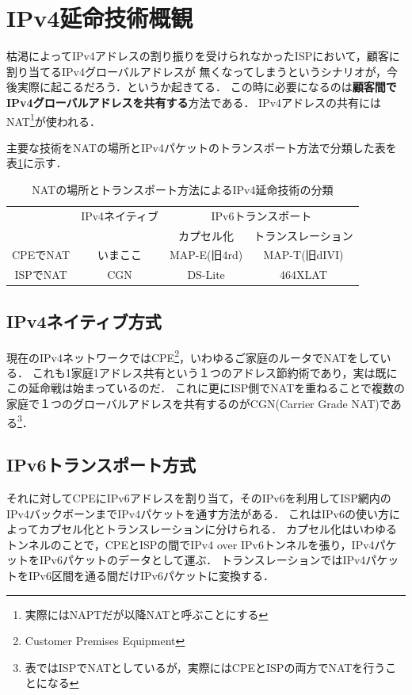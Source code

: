 \section{IPv4延命技術概観}

\lettrine{枯}
渇によってIPv4アドレスの割り振りを受けられなかったISPにおいて，顧客に割り当てるIPv4グローバルアドレスが
無くなってしまうというシナリオが，今後実際に起こるだろう．というか起きてる．
この時に必要になるのは\textbf{顧客間でIPv4グローバルアドレスを共有する}方法である．
IPv4アドレスの共有にはNAT\footnote{実際にはNAPTだが以降NATと呼ぶことにする}が使われる．

主要な技術をNATの場所とIPv4パケットのトランスポート方法で分類した表を表\ref{yuyarin-nat-transport}に示す．

\begin{table}[htbp]
\begin{center}
\begin{tabular}{cccc} \hline
 & IPv4ネイティブ & \multicolumn{2}{c}{IPv6トランスポート} \\
 & & カプセル化 & トランスレーション \\\hline
CPEでNAT & いまここ & MAP-E(旧4rd) & MAP-T(旧dIVI) \\
ISPでNAT & CGN & DS-Lite & 464XLAT \\\hline
\end{tabular}
\end{center}
\caption{NATの場所とトランスポート方法によるIPv4延命技術の分類}
\label{yuyarin-nat-transport}
\end{table}

\subsection{IPv4ネイティブ方式}

現在のIPv4ネットワークではCPE\footnote{Customer Premises Equipment}，いわゆるご家庭のルータでNATをしている．
これも1家庭1アドレス共有という１つのアドレス節約術であり，実は既にこの延命戦は始まっているのだ．
これに更にISP側でNATを重ねることで複数の家庭で１つのグローバルアドレスを共有するのがCGN(Carrier Grade NAT)である\footnote{表ではISPでNATとしているが，実際にはCPEとISPの両方でNATを行うことになる}．

\subsection{IPv6トランスポート方式}
それに対してCPEにIPv6アドレスを割り当て，そのIPv6を利用してISP網内のIPv4バックボーンまでIPv4パケットを通す方法がある．
これはIPv6の使い方によってカプセル化とトランスレーションに分けられる．
カプセル化はいわゆるトンネルのことで，CPEとISPの間でIPv4 over IPv6トンネルを張り，IPv4パケットをIPv6パケットのデータとして運ぶ．
トランスレーションではIPv4パケットをIPv6区間を通る間だけIPv6パケットに変換する．

